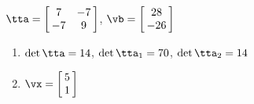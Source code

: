 {$\tta = \left[\hskip -3pt \begin{array}{cc} 7&-7\\  -7&9\end {array} \hskip -3pt
 \right] $,
 \quad
$\vb = \left[\hskip -3pt \begin{array}{c} 28\\  -26\end {array} \hskip -3pt
 \right]$}
{\begin{enumerate}
\item	$\det{\tta} = 14$, $\det{\tta_1} = 70$, $\det{\tta_2} = 14$
\item $\vx = \left[\hskip -3pt \begin{array}{c} 5\\  1\end{array}\hskip -3pt \right]$
\end{enumerate}
}
  

  

 


